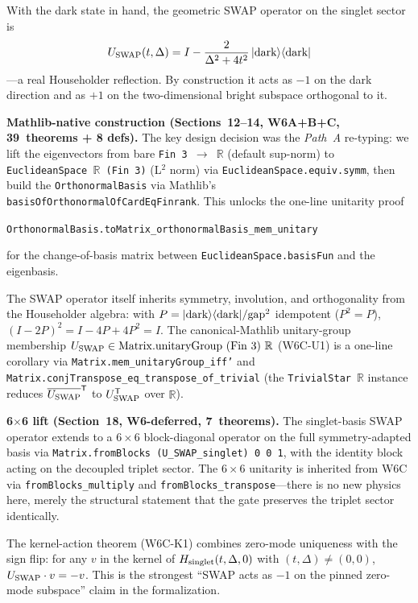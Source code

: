 \documentclass[aps,prd,twocolumn,showpacs,superscriptaddress,nofootinbib]{revtex4-2}
\newcommand{\ket}[1]{|#1\rangle}
\newcommand{\bra}[1]{\langle#1|}
\newcommand{\USWAP}{U_{\rm SWAP}}
\begin{document}
With the dark state in hand, the geometric SWAP operator on the singlet
sector is
\begin{equation}
\USWAP(t, \Delta) = I - \frac{2}{\Delta^2 + 4t^2}\,
\ket{\text{dark}}\bra{\text{dark}}
\label{eq:USWAP}
\end{equation}
---a real Householder reflection. By construction it acts as $-1$ on
the dark direction and as $+1$ on the two-dimensional bright subspace
orthogonal to it.

\textbf{Mathlib-native construction (Sections~12--14, W6A+B+C,
39~theorems + 8 defs).} The key design decision was the \emph{Path~A}
re-typing: we lift the eigenvectors from bare
\texttt{Fin~3~$\to$~$\mathbb{R}$} (default sup-norm) to
\texttt{EuclideanSpace~$\mathbb{R}$~(Fin~3)} (L${}^2$ norm) via
\texttt{EuclideanSpace.equiv.symm}, then build the
\texttt{OrthonormalBasis} via Mathlib's
\texttt{basisOfOrthonormalOfCardEqFinrank}. This unlocks the one-line
unitarity proof
\begin{center}
\texttt{OrthonormalBasis.toMatrix\_orthonormalBasis\_mem\_unitary}
\end{center}
for the change-of-basis matrix between \texttt{EuclideanSpace.basisFun}
and the eigenbasis.

The SWAP operator itself inherits symmetry, involution, and
orthogonality from the Householder algebra: with $P = \ket{\rm dark}\bra{\rm dark}/\text{gap}^2$
idempotent ($P^2 = P$), $(I - 2P)^2 = I - 4P + 4P^2 = I$. The
canonical-Mathlib unitary-group membership
$\USWAP \in \mathrm{Matrix.unitaryGroup~(Fin~3)~}\mathbb{R}$ (W6C-U1)
is a one-line corollary via \texttt{Matrix.mem\_unitaryGroup\_iff'}
and \texttt{Matrix.conjTranspose\_eq\_transpose\_of\_trivial} (the
\texttt{TrivialStar}~$\mathbb{R}$ instance reduces
$\overline{\USWAP}^{\mathsf{T}}$ to $\USWAP^{\mathsf{T}}$ over
$\mathbb{R}$).

\textbf{6$\times$6 lift (Section~18, W6-deferred, 7~theorems).} The
singlet-basis SWAP operator extends to a $6\times 6$ block-diagonal
operator on the full symmetry-adapted basis via
\texttt{Matrix.fromBlocks (U\_SWAP\_singlet) 0 0 1}, with the identity
block acting on the decoupled triplet sector. The $6\times 6$
unitarity is inherited from W6C via \texttt{fromBlocks\_multiply}
and \texttt{fromBlocks\_transpose}---there is no new physics here,
merely the structural statement that the gate preserves the triplet
sector identically.

The kernel-action theorem (W6C-K1) combines zero-mode uniqueness with
the sign flip: for any $v$ in the kernel of
$H_{\rm singlet}(t,\Delta,0)$ with $(t,\Delta) \ne (0,0)$,
$\USWAP\cdot v = -v$. This is the strongest ``SWAP acts as $-1$ on the
pinned zero-mode subspace'' claim in the formalization.
\end{document}
